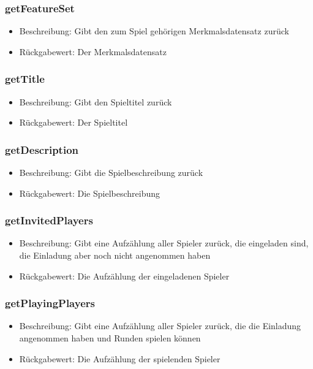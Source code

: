 \documentclass[a4paper]{scrreprt}
\begin{document}
	\subsubsection{getFeatureSet}
	\begin{itemize}
		\item Beschreibung: Gibt den zum Spiel gehörigen Merkmalsdatensatz zurück
		\item Rückgabewert: Der Merkmalsdatensatz
	\end{itemize}
	\subsubsection{getTitle}
	\begin{itemize}
		\item Beschreibung: Gibt den Spieltitel zurück
		\item Rückgabewert: Der Spieltitel
	\end{itemize}
	\subsubsection{getDescription}
	\begin{itemize}
		\item Beschreibung: Gibt die Spielbeschreibung zurück
		\item Rückgabewert: Die Spielbeschreibung
	\end{itemize}
	\subsubsection{getInvitedPlayers}
	\begin{itemize}
		\item Beschreibung: Gibt eine Aufzählung aller Spieler zurück, die eingeladen sind, die Einladung aber noch nicht angenommen haben
		\item Rückgabewert: Die Aufzählung der eingeladenen Spieler
	\end{itemize}
	\subsubsection{getPlayingPlayers}
	\begin{itemize}
		\item Beschreibung: Gibt eine Aufzählung aller Spieler zurück, die die Einladung angenommen haben und Runden spielen können
		\item Rückgabewert: Die Aufzählung der spielenden Spieler
	\end{itemize}
\end{document}

